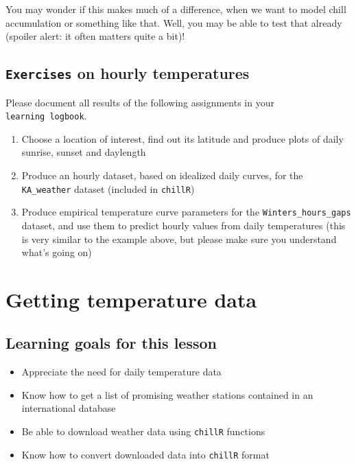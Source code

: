 \documentclass[
]{book}
\providecommand{\tightlist}{%
  \setlength{\itemsep}{0pt}\setlength{\parskip}{0pt}}
\begin{document}
You may wonder if this makes much of a difference, when we want to model chill accumulation or something like that. Well, you may be able to test that already (spoiler alert: it often matters quite a bit)!

\hypertarget{exercises_hourly}{%
\section*{\texorpdfstring{\texttt{Exercises} on hourly temperatures}{Exercises on hourly temperatures}}\label{exercises_hourly}}

Please document all results of the following assignments in your \texttt{learning\ logbook}.

\begin{enumerate}
\def\labelenumi{\arabic{enumi})}
\tightlist
\item
  Choose a location of interest, find out its latitude and produce plots of daily sunrise, sunset and daylength
\item
  Produce an hourly dataset, based on idealized daily curves, for the \texttt{KA\_weather} dataset (included in \texttt{chillR})
\item
  Produce empirical temperature curve parameters for the \texttt{Winters\_hours\_gaps} dataset, and use them to predict hourly values from daily temperatures (this is very similar to the example above, but please make sure you understand what's going on)
\end{enumerate}

\hypertarget{get_temp_data}{%
\chapter{Getting temperature data}\label{get_temp_data}}

\hypertarget{goals_get_temps}{%
\section*{Learning goals for this lesson}\label{goals_get_temps}}

\begin{itemize}
\tightlist
\item
  Appreciate the need for daily temperature data
\item
  Know how to get a list of promising weather stations contained in an international database
\item
  Be able to download weather data using \texttt{chillR} functions
\item
  Know how to convert downloaded data into \texttt{chillR} format
\end{itemize}
\end{document}
